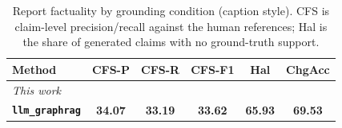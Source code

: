 \begin{table}[t]
\centering
\caption{Report factuality by grounding condition (caption style). CFS is claim-level precision/recall against the human references; Hal is the share of generated claims with no ground-truth support.}
\label{tab:factuality_caption}
\setlength{\tabcolsep}{3pt}
\begin{tabular}{lccccc}
\toprule
Method & CFS-P & CFS-R & CFS-F1 & Hal & ChgAcc \\
\midrule
\multicolumn{6}{l}{\emph{This work}} \\
\textbf{\texttt{llm\_graphrag}} & \textbf{34.07} & \textbf{33.19} & \textbf{33.62} & \textbf{65.93} & \textbf{69.53} \\
\bottomrule
\end{tabular}
\end{table}
